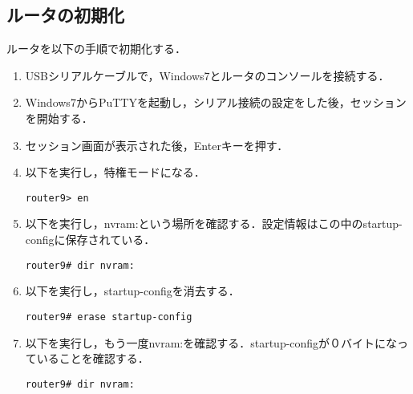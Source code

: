 \documentclass[a4j,titlepage]{jarticle}
\begin{document}
\begin{enumerate}
\begin{enumerate}
\end{enumerate}

\subsection{ルータの初期化}
ルータを以下の手順で初期化する．

\begin{enumerate}

\item USBシリアルケーブルで，Windows7とルータのコンソールを接続する．

\item Windows7からPuTTYを起動し，シリアル接続の設定をした後，セッションを開始する．

\item セッション画面が表示された後，Enterキーを押す．

\item 以下を実行し，特権モードになる．
\begin{screen}
\begin{center}
\begin{verbatim}
router9> en
\end{verbatim}
\end{center}
\end{screen}

\item 以下を実行し，nvram:という場所を確認する．設定情報はこの中のstartup-configに保存されている．
\begin{screen}
\begin{center}
\begin{verbatim}
router9# dir nvram:
\end{verbatim}
\end{center}
\end{screen}

\item 以下を実行し，startup-configを消去する．
\begin{screen}
\begin{center}
\begin{verbatim}
router9# erase startup-config
\end{verbatim}
\end{center}
\end{screen}

\item 以下を実行し，もう一度nvram:を確認する．startup-configが０バイトになっていることを確認する．
\begin{screen}
\begin{center}
\begin{verbatim}
router9# dir nvram:
\end{verbatim}
\end{center}
\end{screen}


\end{enumerate}
\end{enumerate}
\end{document}
